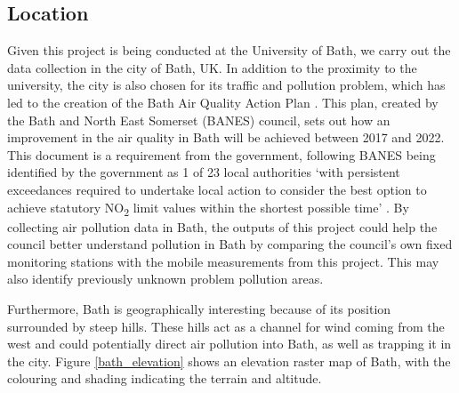 \documentclass[11pt,twosided,a4paper]{report}
\begin{document}

\subsection{Location} \label{location}

Given this project is being conducted at the University of Bath, we carry out the data collection in the city of Bath, UK. In addition to the proximity to the university, the city is also chosen for its traffic and pollution problem, which has led to the creation of the Bath Air Quality Action Plan \citep{BANES2017baqap}. This plan, created by the Bath and North East Somerset (BANES) council, sets out how an improvement in the air quality in Bath will be achieved between 2017 and 2022. This document is a requirement from the government, following BANES being identified by the government as 1 of 23 local authorities `with persistent exceedances required to undertake local action to consider the best option to achieve statutory NO\textsubscript{2} limit values within the shortest possible time' \citep{DEFRA2017uknoxplan}. By collecting air pollution data in Bath, the outputs of this project could help the council better understand pollution in Bath by comparing the council's own fixed monitoring stations with the mobile measurements from this project. This may also identify previously unknown problem pollution areas.


Furthermore, Bath is geographically interesting because of its position surrounded by steep hills. These hills act as a channel for wind coming from the west and could potentially direct air pollution into Bath, as well as trapping it in the city. Figure \ref{bath_elevation} shows an elevation raster map of Bath, with the colouring and shading indicating the terrain and altitude.
\end{document}
